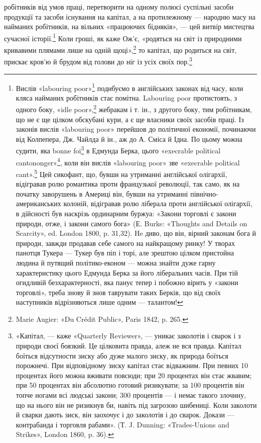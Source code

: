 робітників від умов праці, перетворити на одному
полюсі суспільні засоби продукції та засоби існування на капітал,
а на протилежному — народню масу на найманих робітників,
на вільних «працюючих бідняків», — цей витвір мистецтва
сучасної історії.\footnote{
Вислів «labouring poor»\footnote*{
— працюючі бідняки. Peд.
} подибуємо в англійських законах від
часу, коли кляса найманих робітників стає помітна. Labouring poor протистоять,
з одного боку, «idle poor»,\footnote*{
— біднякам-неробам. Peд.
} жебракам і т. ін., з другого боку,
тим робітникам, що не є ще цілком обскубані кури, а є ще власники
своїх засобів праці. Із законів вислів «labouring poor» перейшов
до політичної економії, починаючи від Колпепера, Дж. Чайлда й ін.,
аж до А. Сміса й Ідна. По цьому можна судити, яка bonne foi\footnote*{
— сумлінність. Peд.
} в Едмунда
Берка, цього «execrable political cantononger»\footnote*{
— огидливого політичного крамаря. Peд.
}, коли він вислів
«labouring poor» зве «execrable political cant».\footnote*{
— огидливим політичним перекрученням. \emph{Ред.}
} Цей сикофант, що,
бувши на утриманні англійської олігархії, відігравав ролю романтика проти
французької революції, так само, як на початку заворушень в Америці
він, бувши на утриманні північно-американських колоній, відігравав
ролю ліберала проти англійської олігархії, в дійсності був наскрізь ординарним
буржуа: «Закони торговлі є закони природи, отже, і закони самого
бога» (Е. Burke: «Thoughts and Details on Scarcity», ed. London
1800, p. 31,32). He диво, що він, вірний законам бога й природи, завжди
продавав себе самого на найкращому ринку! У творах панотця Тукера —
Тукер був піп і торі, але зрештою цілком пристойна людина й путящий
політико-економ — можна знайти дуже гарну характеристику цього
Едмунда Берка за його ліберальних часів. При тій огидливій безхарактерності,
яка панує тепер і побожно вірить у «закони торговлі», треба
знову й знов таврувати таких Берків, що від своїх наступників відрізняються
лише одним — талантом!
} Коли гроші, як каже Ож’є, «родяться на
світ із природними кривавими плямами лише на одній щоці»,\footnote{
Marie Augier: «Du Crédit Public», Paris 1842, p. 265.
}
то капітал, що родиться на світ, прискає кров’ю й брудом від
голови до ніг із усіх своїх пор.\footnote{
«Капітал, — каже «Quarterly Reviewer», — уникає заколотів
і сварок і з природи своєї боязкий. Це цілковита правда, алеж не вся
правда. Капітал боїться відсутности зиску або дуже малого зиску, як
природа боїться порожнечі. При відповідному зиску капітал стає відважним.
При певних 10 процентах його можна вживати повсюди; при 20 процентах
він стає жвавим; при 50 процентах він абсолютно готовий ризикувати;
за 100 процентів він топче ногами всі людські закони; 300 процентів
— і немає такого злочину, що на нього він не ризикнув би, навіть
під загрозою шибениці. Коли заколоти й сварки дають зиск, він заохочує
і до заколотів і до сварок. Докази — контрабанда і торговля рабами».
(Т. J. Dunning: «Trades-Unions and Strikes», London 1860, p. 36).
}

